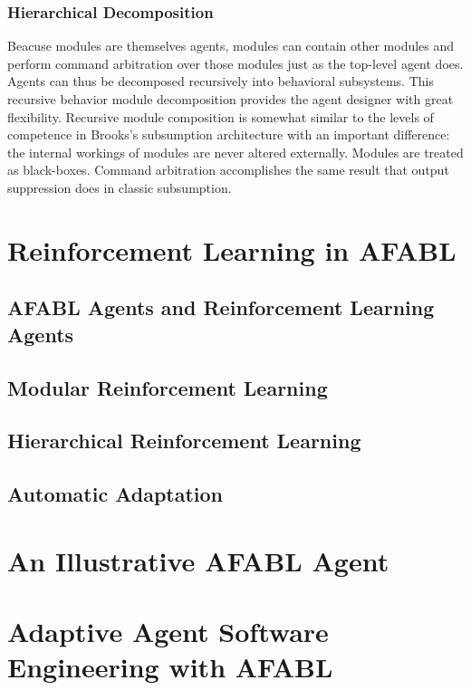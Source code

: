 \subsubsection{Hierarchical Decomposition}


Beacuse modules are themselves agents, modules can contain other
modules and perform command arbitration over those modules just as the
top-level agent does.  Agents can thus be decomposed recursively into
behavioral subsystems.  This recursive behavior module decomposition
provides the agent designer with great flexibility.  Recursive module
composition is somewhat similar to the levels of competence in
Brooks's subsumption architecture with an important difference: the
internal workings of modules are never altered externally.  Modules
are treated as black-boxes.  Command arbitration accomplishes the same
result that output suppression does in classic subsumption.

\section{Reinforcement Learning in AFABL}

\subsection{AFABL Agents and Reinforcement Learning Agents}

\subsection{Modular Reinforcement Learning}

\subsection{Hierarchical Reinforcement Learning}

\subsection{Automatic Adaptation}

\section{An Illustrative AFABL Agent}


\section{Adaptive Agent Software Engineering with AFABL}


